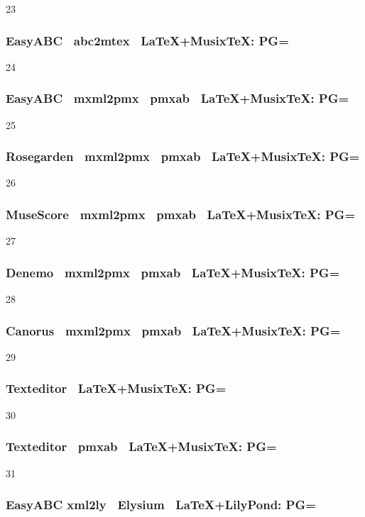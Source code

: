 23

\subsubsection{EasyABC \ra\ abc2mtex \ra\ \LaTeX+Musix\TeX: PG=} 

24

\subsubsection{EasyABC \ra\ mxml2pmx \ra\ pmxab \ra\ \LaTeX+Musix\TeX: PG=} 

25

\subsubsection{Rosegarden \ra\ mxml2pmx \ra\ pmxab \ra\ \LaTeX+Musix\TeX: PG=}

26

\subsubsection{MuseScore \ra\ mxml2pmx \ra\ pmxab \ra\ \LaTeX+Musix\TeX: PG=}

27

\subsubsection{Denemo \ra\ mxml2pmx \ra\ pmxab \ra\ \LaTeX+Musix\TeX: PG=} 

28

\subsubsection{Canorus \ra\ mxml2pmx \ra\ pmxab \ra\ \LaTeX+Musix\TeX: PG=} 

29

\subsubsection{Texteditor \ra\ \LaTeX+Musix\TeX: PG=}

30

\subsubsection{Texteditor \ra\ pmxab \ra\ \LaTeX+Musix\TeX: PG=}

31

\subsubsection{Easy\-ABC \ra xml2ly \ra\ Elysium \ra\ \LaTeX+LilyPond: PG=} 

